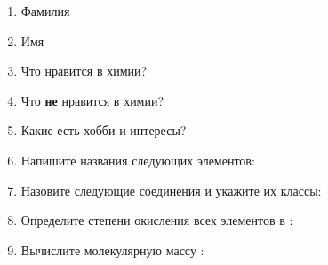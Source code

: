 \documentclass[12pt, a4paper, oneside]{article}	%
\begin{document}
\begin{enumerate}[1.] %
	\item
		Фамилия

		\hrulefill

	\item
		Имя

		\hrulefill

	\item
		Что нравится в химии?

		\hrulefill

		\hrulefill

	\item
		Что \textbf{не} нравится в химии?

		\hrulefill

		\hrulefill

	\item
		Какие есть хобби и интересы?

		\hrulefill

		\hrulefill

	\item
		Напишите названия следующих элементов:


		\hrulefill

		\hrulefill

	\item
		Назовите следующие соединения и укажите их классы:


		\hrulefill

		\hrulefill
	
		\hrulefill
	
	\item
		Определите степени окисления всех элементов в :

		\hrulefill

		\hrulefill
	
	\item
		Вычислите молекулярную массу :

		\hrulefill

		\hrulefill

\end{enumerate}
\end{document}
